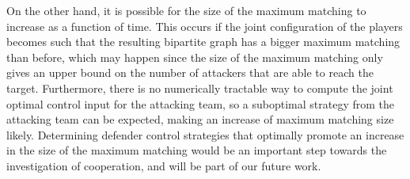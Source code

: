 On the other hand, it is possible for the size of the maximum matching to increase as a function of time. This occurs if the joint configuration of the players becomes such that the resulting bipartite graph has a bigger maximum matching than before, which may happen since the size of the maximum matching only gives an upper bound on the number of attackers that are able to reach the target. Furthermore, there is no numerically tractable way to compute the joint optimal control input for the attacking team, so a suboptimal strategy from the attacking team can be expected, making an increase of maximum matching size likely. Determining defender control strategies that optimally promote an increase in the size of the maximum matching would be an important step towards the investigation of cooperation, and will be part of our future work.